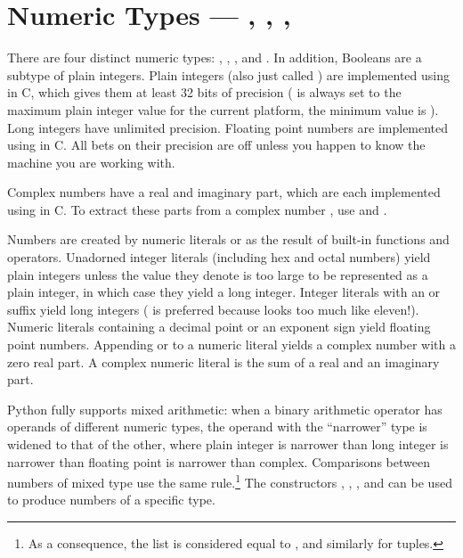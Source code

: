 \section{Numeric Types ---
	    , , , 
	    \label{typesnumeric}}

There are four distinct numeric types: ,
, 
, and .
In addition, Booleans are a subtype of plain integers.
Plain integers (also just called )
are implemented using  in C, which gives them at least 32
bits of precision ( is always set to the maximum
plain integer value for the current platform, the minimum value is 
).  Long integers have unlimited precision.
Floating point numbers are implemented using  in C.
All bets on their precision are off unless you happen to know the
machine you are working with.

Complex numbers have a real and imaginary part, which are each
implemented using  in C.  To extract these parts from
a complex number , use  and .

Numbers are created by numeric literals or as the result of built-in
functions and operators.  Unadorned integer literals (including hex
and octal numbers) yield plain integers unless the value they denote
is too large to be represented as a plain integer, in which case
they yield a long integer.  Integer literals with an
 or  suffix yield long integers
( is preferred because  looks too much like
eleven!).  Numeric literals containing a decimal point or an exponent
sign yield floating point numbers.  Appending  or
 to a numeric literal yields a complex number with a
zero real part. A complex numeric literal is the sum of a real and
an imaginary part.

Python fully supports mixed arithmetic: when a binary arithmetic
operator has operands of different numeric types, the operand with the
``narrower'' type is widened to that of the other, where plain
integer is narrower than long integer is narrower than floating point is
narrower than complex.
Comparisons between numbers of mixed type use the same rule.\footnote{
	As a consequence, the list \code{[1, 2]} is considered equal
        to \code{[1.0, 2.0]}, and similarly for tuples.
} The constructors , , ,
and  can be used
to produce numbers of a specific type.

